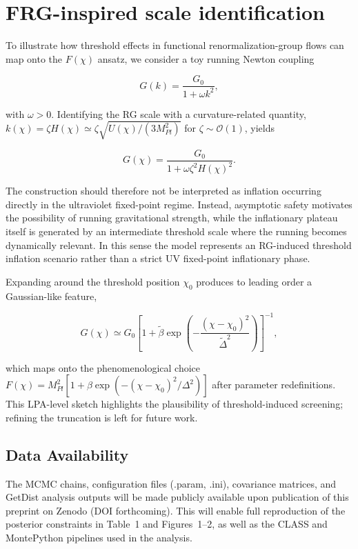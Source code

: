 \documentclass[
]{article}
\begin{document}
\section{FRG-inspired scale
identification}\label{frg-inspired-scale-identification}

To illustrate how threshold effects in functional renormalization-group
flows can map onto the \(F(\chi)\) ansatz, we consider a toy running
Newton coupling

\[
G(k) = \frac{G_{0}}{1 + \omega k^{2}},
\]

with \(\omega > 0\). Identifying the RG scale with a curvature-related
quantity,
\(k(\chi) = \zeta H(\chi) \simeq \zeta\sqrt{U(\chi)/(3M_{Pl}^{2})}\) for
\(\zeta \sim \mathcal{O}(1)\), yields

\[
G(\chi) = \frac{G_{0}}{1 + \omega\zeta^{2}H(\chi)^{2}}.
\]

The construction should therefore not be interpreted as inflation
occurring directly in the ultraviolet fixed-point regime. Instead,
asymptotic safety motivates the possibility of running gravitational
strength, while the inflationary plateau itself is generated by an
intermediate threshold scale where the running becomes dynamically
relevant. In this sense the model represents an RG-induced threshold
inflation scenario rather than a strict UV fixed-point inflationary
phase.

Expanding around the threshold position \(\chi_{0}\) produces to leading
order a Gaussian-like feature,

\[
G(\chi) \simeq G_{0}\left\lbrack 1 + \widetilde{\beta}\exp\left( - \frac{(\chi - \chi_{0})^{2}}{{\widetilde{\Delta}}^{2}} \right) \right\rbrack^{- 1},
\]

which maps onto the phenomenological choice
\(F(\chi) = M_{Pl}^{2}\left\lbrack 1 + \beta\exp( - (\chi - \chi_{0})^{2}/\Delta^{2}) \right\rbrack\)
after parameter redefinitions. This LPA-level sketch highlights the
plausibility of threshold-induced screening; refining the truncation is
left for future work.

\subsection{Data Availability}\label{data-availability}

The MCMC chains, configuration files (.param, .ini), covariance
matrices, and GetDist analysis outputs will be made publicly available
upon publication of this preprint on Zenodo (DOI forthcoming). This will
enable full reproduction of the posterior constraints in Table~1 and
Figures~1--2, as well as the CLASS and MontePython pipelines used in the
analysis.
\end{document}
